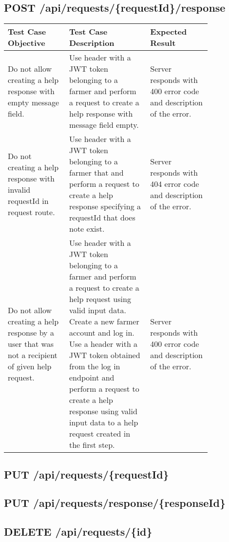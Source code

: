 \subsection{POST \slash api\slash requests\slash \{requestId\}\slash response}

\begin{longtable}{p{0.25\linewidth}p{0.33\linewidth}p{0.25\linewidth}}
	\toprule
	\textbf{Test Case Objective} & \textbf{Test Case Description} & \textbf{Expected Result}\\
	\midrule
	Do not allow creating a help response with empty message field. & Use header with a JWT token belonging to a farmer and perform a request to create a help response with message field empty. & Server responds with 400 error code and description of the error.\\
	
	
	Do not creating a help response with invalid requestId in request route. & Use header with a JWT token belonging to a farmer that and perform a request to create a help response specifying a requestId that does note exist. &  Server responds with 404 error code and description of the error.\\
	
	Do not allow creating a help response by a user that was not a recipient of given help request. & Use header with a JWT token belonging to a farmer and perform a request to create a help request using valid input data. Create a new farmer account and log in. Use a header with a JWT token obtained from the log in endpoint and perform a request to create a help response using valid input data to a help request created in the first step. & Server responds with 400 error code and description of the error.\todo{add happy path}\\
	
	\bottomrule
\end{longtable}


\subsection{PUT \slash api\slash requests\slash \{requestId\}}
\subsection{PUT \slash api\slash requests\slash response\slash \{responseId\}}
\subsection{DELETE \slash api\slash requests\slash \{id\}}
